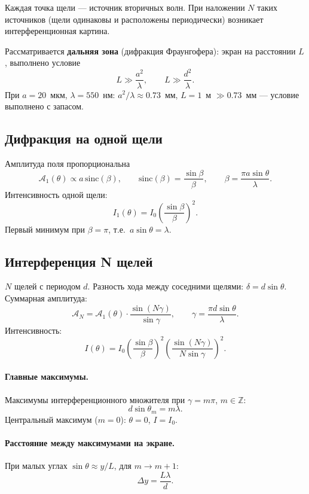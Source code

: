 \documentclass[12pt,a4paper]{article}
\begin{document}
Каждая точка щели --- источник вторичных волн. При наложении \(N\) таких
источников (щели одинаковы и расположены периодически) возникает
интерференционная картина.

Рассматривается \textbf{дальняя зона} (дифракция Фраунгофера): экран на
расстоянии \(L\), выполнено условие
\[
L \gg \frac{a^2}{\lambda}, \qquad L \gg \frac{d^2}{\lambda}.
\]
При \(a=20\)~мкм, \(\lambda=550\)~нм: \(a^2/\lambda\approx0.73\)~мм,
\(L=1\)~м \(\gg 0.73\)~мм --- условие выполнено с запасом.

\subsection{Дифракция на одной щели}

Амплитуда поля пропорциональна
\[
\mathcal{A}_1(\theta) \propto a\,\mathrm{sinc}(\beta),
\qquad
\mathrm{sinc}(\beta)=\frac{\sin\beta}{\beta},
\qquad
\beta=\frac{\pi a\sin\theta}{\lambda}.
\]
Интенсивность одной щели:
\begin{equation}\label{eq:single}
I_1(\theta)=I_0\left(\frac{\sin\beta}{\beta}\right)^2.
\end{equation}
Первый минимум при \(\beta=\pi\), т.е.\ \(a\sin\theta=\lambda\).

\subsection{Интерференция N щелей}

\(N\) щелей с периодом \(d\). Разность хода между соседними щелями:
\(\delta=d\sin\theta\). Суммарная амплитуда:
\[
\mathcal{A}_N = \mathcal{A}_1(\theta)\cdot
\frac{\sin(N\gamma)}{\sin\gamma},
\qquad
\gamma=\frac{\pi d\sin\theta}{\lambda}.
\]
Интенсивность:
\begin{equation}\label{eq:Nslit}
I(\theta)=I_0
\left(\frac{\sin\beta}{\beta}\right)^2
\left(\frac{\sin(N\gamma)}{N\sin\gamma}\right)^2.
\end{equation}

\paragraph{Главные максимумы.} Максимумы интерференционного множителя при
\(\gamma=m\pi\), \(m\in\mathbb{Z}\):
\[
d\sin\theta_m = m\lambda.
\]
Центральный максимум (\(m=0\)): \(\theta=0\), \(I=I_0\).

\paragraph{Расстояние между максимумами на экране.}
При малых углах \(\sin\theta\approx y/L\), для \(m\to m+1\):
\begin{equation}\label{eq:delta-y}
\Delta y = \frac{L\lambda}{d}.
\end{equation}
\end{document}
